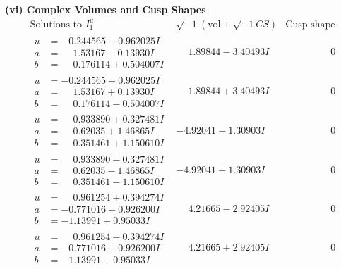 \documentclass[1p]{elsarticle_modified}
\theoremstyle{definition}
\newcommand{\I}{\sqrt{-1}}
\begin{document}
\newpage\flushleft \textbf{(vi) Complex Volumes and Cusp Shapes}
$$\begin{array}{c|c|c}  
\text{Solutions to }I^u_{1}& \I (\text{vol} + \sqrt{-1}CS) & \text{Cusp shape}\\
 \hline 
\begin{aligned}
u &= -0.244565 + 0.962025 I \\
a &= \phantom{-}1.53167 - 0.13930 I \\
b &= \phantom{-}0.176114 + 0.504007 I\end{aligned}
 & \phantom{-}1.89844 - 3.40493 I & \phantom{-0.000000 } 0 \\ \hline\begin{aligned}
u &= -0.244565 - 0.962025 I \\
a &= \phantom{-}1.53167 + 0.13930 I \\
b &= \phantom{-}0.176114 - 0.504007 I\end{aligned}
 & \phantom{-}1.89844 + 3.40493 I & \phantom{-0.000000 } 0 \\ \hline\begin{aligned}
u &= \phantom{-}0.933890 + 0.327481 I \\
a &= \phantom{-}0.62035 + 1.46865 I \\
b &= \phantom{-}0.351461 + 1.150610 I\end{aligned}
 & -4.92041 - 1.30903 I & \phantom{-0.000000 } 0 \\ \hline\begin{aligned}
u &= \phantom{-}0.933890 - 0.327481 I \\
a &= \phantom{-}0.62035 - 1.46865 I \\
b &= \phantom{-}0.351461 - 1.150610 I\end{aligned}
 & -4.92041 + 1.30903 I & \phantom{-0.000000 } 0 \\ \hline\begin{aligned}
u &= \phantom{-}0.961254 + 0.394274 I \\
a &= -0.771016 - 0.926200 I \\
b &= -1.13991 + 0.95033 I\end{aligned}
 & \phantom{-}4.21665 - 2.92405 I & \phantom{-0.000000 } 0 \\ \hline\begin{aligned}
u &= \phantom{-}0.961254 - 0.394274 I \\
a &= -0.771016 + 0.926200 I \\
b &= -1.13991 - 0.95033 I\end{aligned}
 & \phantom{-}4.21665 + 2.92405 I & \phantom{-0.000000 } 0 \\ \hline\begin{aligned}

\end{aligned}
\end{array}$$
\end{document}
